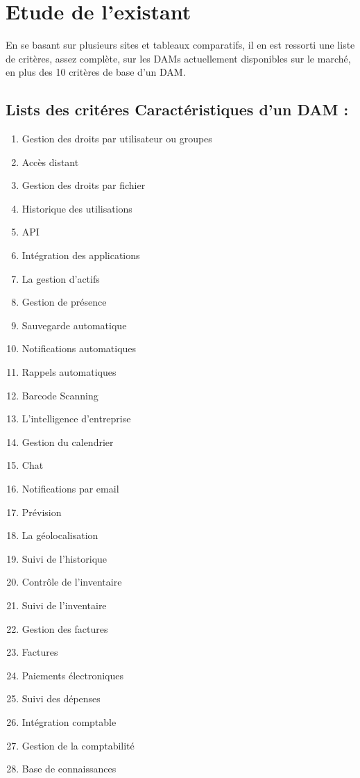 \chapter{Etude de l'existant}
En se basant sur plusieurs sites et tableaux comparatifs, il en est ressorti une liste de critères, assez complète, sur les DAMs actuellement disponibles sur le marché, en plus des 10 critères de base d'un DAM.

\section{Lists des critéres Caractéristiques d'un DAM :}
\begin{enumerate}
\item Gestion des droits par utilisateur ou groupes
\item Accès distant
\item Gestion des droits par fichier 	
\item Historique des utilisations	
\item API
\item Intégration des applications
\item La gestion d'actifs
\item Gestion de présence
\item Sauvegarde automatique
\item Notifications automatiques
\item Rappels automatiques
\item Barcode Scanning
\item L'intelligence d'entreprise
\item Gestion du calendrier
\item Chat
\item Notifications par email
\item Prévision
\item La géolocalisation
\item Suivi de l'historique
\item Contrôle de l'inventaire
\item Suivi de l'inventaire
\item Gestion des factures
\item Factures
\item Paiements électroniques
\item Suivi des dépenses
\item Intégration comptable
\item Gestion de la comptabilité
\item Base de connaissances

\end{enumerate}
